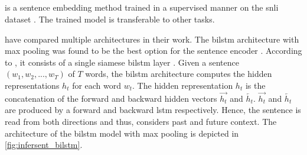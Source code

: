 \subsection{\infersent{}}\label{subsec:inferSent}

\infersent{} is a sentence embedding method trained in a supervised manner on the \ac{snli} dataset \cite{inferSent2018, HfsentTrans2019}.
The trained model is transferable to other tasks.




\citeauthor{inferSent2018} have compared multiple architectures in their work.
The \ac{bilstm} architecture with max pooling was found to be the best option for the sentence encoder \cite{inferSent2018}.
According to \citeauthor{HfsentTrans2019}, it consists of a single siamese \ac{bilstm} layer \cite{HfsentTrans2019}.
Given a sentence $(w_1, w_2, ..., w_T)$ of $T$ words, the \ac{bilstm} architecture computes the hidden representations $h_t$ for each word $w_t$.
The hidden representation $h_t$ is the concatenation of the forward and backward hidden vectors $\overrightarrow{h_t}$ and $\overleftarrow{h_t}$.
$\overrightarrow{h_t}$ and $\overleftarrow{h_t}$ are produced by a forward and backward \ac{lstm} respectively.
Hence, the sentence is read from both directions and thus, considers past and future context.
The architecture of the \ac{bilstm} model with max pooling is depicted in \autoref{fig:infersent_bilstm}.

